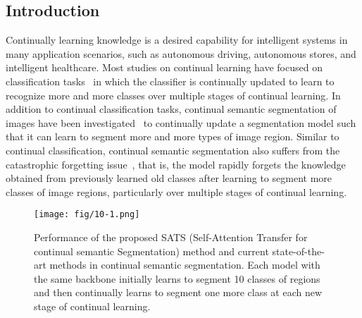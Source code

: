 \documentclass[onecolumn,conference,compsoc]{IEEEtran}
\begin{document}
\begin{spacing}{1.5}

\section{Introduction}\label{sec:introduction}


Continually learning knowledge is a desired capability for intelligent systems in many application scenarios, {such as} autonomous driving, autonomous stores, and intelligent healthcare. Most studies on continual learning {have focused} on classification tasks~\cite{LwF, iCaRL, UCIR, LwM} {in which} the classifier is continually updated to learn to recognize more and more classes over multiple stages of continual learning. {In addition to} continual classification tasks, continual semantic segmentation of images {have been} investigated~\cite{ILT,MiB,PLOP,SDR} to continually update a segmentation model such that it can learn to segment more and more types of image region. {Similar to} continual classification, continual semantic segmentation also suffers from the catastrophic forgetting issue~\cite{CatastrophicForgetting}, {that is,} the model {rapidly forgets the} knowledge {obtained from previously learned old classes} after learning to segment more classes of image regions, particularly over multiple stages of continual learning.

\begin{figure}[hbt]
\centering
    \texttt{[image: fig/10-1.png]}
    \caption{\normalsize Performance {of} the proposed {SATS (Self-Attention Transfer for continual semantic Segmentation) method} and current state-of-the-art methods {in} continual semantic segmentation. Each model with the same backbone initially  {learns} to segment 10 classes of regions and then continually  {learns} to segment one more class at each new stage of continual learning.}
    \label{fig:methodcompare}
\end{figure}


\end{spacing}
\end{document}
